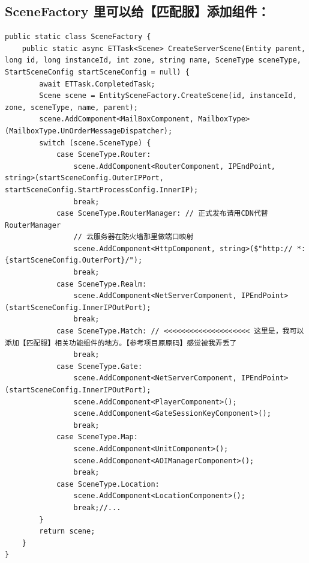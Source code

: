 \documentclass[9pt, b5paper]{article}
\begin{document}
\subsection{SceneFactory 里可以给【匹配服】添加组件：}
\label{sec:orgb62139f}
\begin{verbatim}
public static class SceneFactory {
    public static async ETTask<Scene> CreateServerScene(Entity parent, long id, long instanceId, int zone, string name, SceneType sceneType, StartSceneConfig startSceneConfig = null) {
        await ETTask.CompletedTask;
        Scene scene = EntitySceneFactory.CreateScene(id, instanceId, zone, sceneType, name, parent);
        scene.AddComponent<MailBoxComponent, MailboxType>(MailboxType.UnOrderMessageDispatcher);
        switch (scene.SceneType) {
            case SceneType.Router:
                scene.AddComponent<RouterComponent, IPEndPoint, string>(startSceneConfig.OuterIPPort, startSceneConfig.StartProcessConfig.InnerIP);
                break;
            case SceneType.RouterManager: // 正式发布请用CDN代替RouterManager
                // 云服务器在防火墙那里做端口映射
                scene.AddComponent<HttpComponent, string>($"http:// *:{startSceneConfig.OuterPort}/");
                break;
            case SceneType.Realm:
                scene.AddComponent<NetServerComponent, IPEndPoint>(startSceneConfig.InnerIPOutPort);
                break;
            case SceneType.Match: // <<<<<<<<<<<<<<<<<<<< 这里是，我可以添加【匹配服】相关功能组件的地方。【参考项目原原码】感觉被我弄丢了
                break;
            case SceneType.Gate:
                scene.AddComponent<NetServerComponent, IPEndPoint>(startSceneConfig.InnerIPOutPort);
                scene.AddComponent<PlayerComponent>();
                scene.AddComponent<GateSessionKeyComponent>();
                break;
            case SceneType.Map:
                scene.AddComponent<UnitComponent>();
                scene.AddComponent<AOIManagerComponent>();
                break;
            case SceneType.Location:
                scene.AddComponent<LocationComponent>();
                break;//...
        }
        return scene;
    }
}
\end{verbatim}
\end{document}
